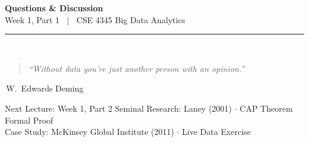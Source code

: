 \documentclass[aspectratio=169,10pt]{beamer}
\begin{document}
\begin{frame}[c]
  \begin{center}
    {\Large\bfseries Questions \& Discussion}\\[10pt]
    {\large Week 1, Part 1 $\;\mid\;$ CSE 4345 Big Data Analytics}\\[8pt]
    \textcolor{PUGray}{\rule{7cm}{0.5pt}}\\[10pt]
    \begin{quote}
    \itshape ``Without data you're just another person with an opinion.''
    \end{quote}
    \hfill\textemdash\,W.\ Edwards Deming
    \vspace{16pt}
    \begin{block}{\centering Next Lecture: Week 1, Part 2}
      \centering
      Seminal Research: Laney (2001) $\cdot$ CAP Theorem Formal Proof\\
      Case Study: McKinsey Global Institute (2011) $\cdot$ Live Data Exercise
    \end{block}
  \end{center}
\end{frame}

\end{document}
